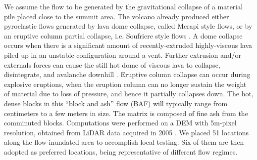 \documentclass{article}
\begin{document}
We assume the flow to be generated by the gravitational collapse of a material pile placed close to the summit area. The volcano already produced either pyroclastic flows generated by lava dome collapse, called Merapi style flows, or by an eruptive column partial collapse, i.e. Soufriere style flows \citep{Macorps2017}. A dome collapse occurs when there is a significant amount of recently-extruded highly-viscous lava piled up in an unstable configuration around a vent. Further extrusion and/or externals forces can cause the still hot dome of viscous lava to collapse, disintegrate, and avalanche downhill \citep{Bursik2005, Wolpert2016, Hyman2018}. Eruptive column collapse can occur during explosive eruptions, when the eruption column can no longer sustain the weight of material due to loss of pressure, and hence it partially collapses down. The hot, dense blocks in this ``block and ash'' flow (BAF) will typically range from centimeters to a few meters in size. The matrix is composed of fine ash from the comminuted blocks. Computations were performed on a DEM with 5m-pixel resolution, obtained from LiDAR data acquired in 2005 \citep{Davila2007, Sulpizio2010}. We placed 51 locations along the flow inundated area to accomplish local testing. Six of them are then adopted as preferred locations, being representative of different flow regimes.
\end{document}
